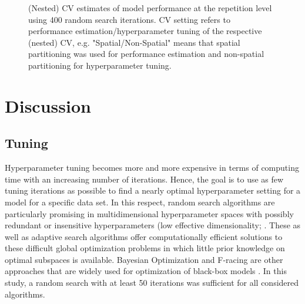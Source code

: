 \documentclass[review]{elsarticle}
\begin{document}
\begin{figure} [t!]
	\begin{center}
		\caption[]{(Nested) \ac{CV} estimates of model performance at the repetition level using 400 random search iterations.
			CV setting refers to performance estimation/hyperparameter tuning of the respective (nested) CV, e.g. "Spatial/Non-Spatial" means that spatial partitioning was used for performance estimation and non-spatial partitioning for hyperparameter tuning.}
		\label{fig:cv_final_boxplots}
	\end{center}
\end{figure}

\section{Discussion}
\label{sec:discussion}

\subsection{Tuning}

Hyperparameter tuning becomes more and more expensive in terms of computing time with an increasing number of iterations.
Hence, the goal is to use as few tuning iterations as possible to find a nearly optimal hyperparameter setting for a model for a specific data set.
In this respect, random search algorithms are particularly promising in multidimensional hyperparameter spaces with possibly redundant or insensitive hyperparameters (low effective dimensionality; \citep{Bergstra2012}.
These as well as adaptive search algorithms offer computationally efficient solutions to these difficult global optimization problems in which little prior knowledge on optimal subspaces is available.
Bayesian Optimization and F-racing are other approaches that are widely used for optimization of black-box models \citep{Birattari2002, Brochu2010, Malkomes2016}.
In this study, a random search with at least 50 iterations was sufficient for all considered algorithms.
\end{document}
